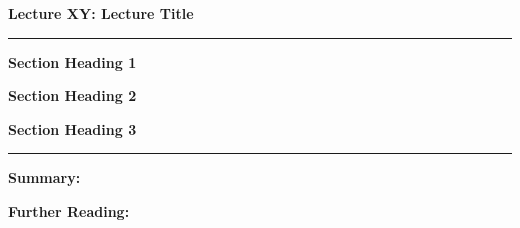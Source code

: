 \documentclass{article}
\begin{document}
\begin{center}
{\bf Lecture XY: Lecture Title}
\end{center}
\hrule
\vspace{1em}



\vspace{2em}
{\bf Section Heading 1}


\vspace{2em}
{\bf Section Heading 2}


\vspace{2em}
{\bf Section Heading 3}

\newpage
\hrule
\vspace{1em}
{\bf Summary:}

{\bf Further Reading:}
\end{document}

